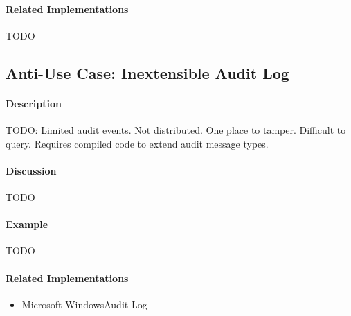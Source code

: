 \paragraph{Related Implementations}

{\Large TODO}

\subsection{Anti-Use Case: Inextensible Audit Log}

\paragraph{Description}

{\Large TODO:} Limited audit events. Not distributed. One place to tamper. Difficult to query. Requires compiled code to extend audit message types.

\paragraph{Discussion}

{\Large TODO}

\paragraph{Example}

{\Large TODO}

\paragraph{Related Implementations}

\begin{itemize}
	\item Microsoft Windows\texttrademark Audit Log
\end{itemize}

